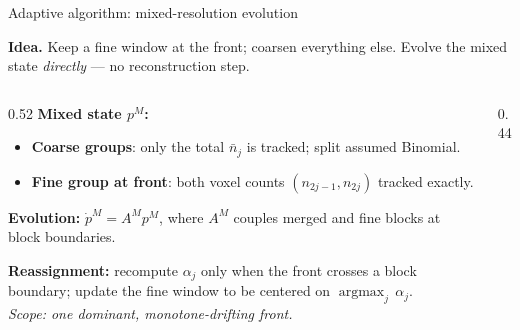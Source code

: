 \documentclass[10pt,aspectratio=169]{beamer}
\begin{document}
\begin{frame}{Adaptive algorithm: mixed-resolution evolution}

  \textbf{Idea.} Keep a fine window at the front; coarsen everything else.
  Evolve the mixed state \emph{directly} — no reconstruction step.

  \medskip
  \begin{columns}[T]
    \begin{column}{0.52\textwidth}
      \textbf{Mixed state $p^M$:}
      \begin{itemize}\setlength\itemsep{0.3em}
        \item \textcolor{coarsecolor}{\textbf{Coarse groups}}: only the total $\bar n_j$
              is tracked; split assumed Binomial.
        \item \textcolor{slowred}{\textbf{Fine group at front}}: both voxel counts
              $(n_{2j-1}, n_{2j})$ tracked exactly.
      \end{itemize}

      \medskip
      \textbf{Evolution:}
      $\dot p^M = A^M p^M$,
      where $A^M$ couples merged and fine blocks at block boundaries.

      \smallskip
      \textbf{Reassignment:} recompute $\alpha_j$ only when the front crosses a block boundary;
      update the fine window to be centered on $\operatorname{argmax}_j\,\alpha_j$.\\
      {\footnotesize\textit{Scope: one dominant, monotone-drifting front.}}
    \end{column}
    \begin{column}{0.44\textwidth}
      \begin{center}
\end{center}
\end{column}
\end{columns}
\end{frame}
\end{document}
